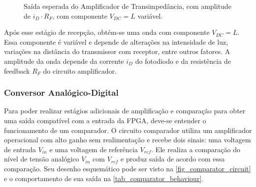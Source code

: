	\begin{figure}[h!]
		\caption{\label{plot-post-tia} Saída esperada do Amplificador de Transimpedância, com amplitude de $i_{D} \cdot R_{F}$, com componente $V_{DC} = L$ variável.}
		\centering
	\end{figure}
	
	Após esse estágio de recepção, obtém-se uma onda com componente $V_{DC} = L$. Essa componente é variável e depende de alterações na intensidade de luz, variações na distância do transmissor com receptor, entre outros fatores. A amplitude da onda depende da corrente  $i_{D}$ do fotodiodo e da resistência de feedback $R_{F}$ do circuito amplificador. 
	
	\subsubsection{Conversor Analógico-Digital}\label{method-hardware-conv-ad}
	
	Para poder realizar estágios adicionais de amplificação e comparação para obter uma saída compatível com a entrada da FPGA, deve-se entender o funcionamento de um comparador. O circuito comparador utiliza um amplificador operacional com alto ganho sem realimentação e recebe dois sinais: uma voltagem de entrada $V_{in}$ e uma voltagem de referência $V_{ref}$. Ele realiza a comparação do nível de tensão analógico $V_{in}$ com $V_{ref}$ e produz saída de acordo com essa comparação. Seu desenho esquemático pode ser visto na \autoref{fig_comparator_circuit} e o comportamento de sua saída na \autoref{tab_comparator_behaviour}. 
	
